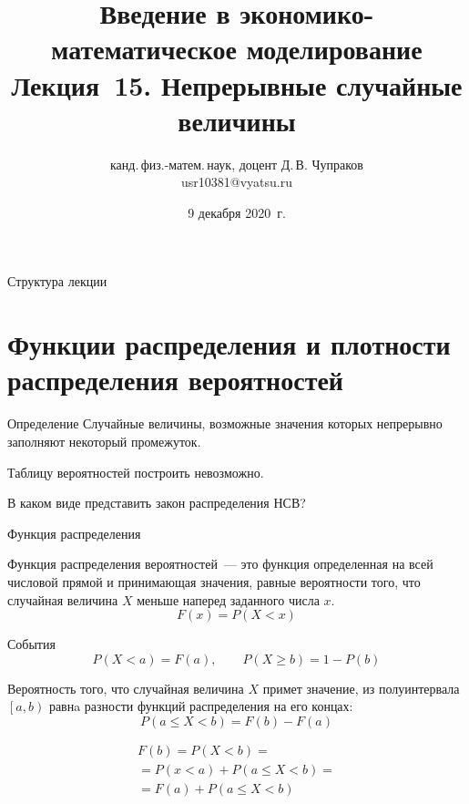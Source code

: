 \documentclass[unicode,11pt,notheorems,xcolor=table]{beamer}
\author[Д.\,В. Чупраков]{канд.\,физ.-матем.\,наук, доцент Д.\,В. Чупраков\\[6pt] usr10381@vyatsu.ru}
\institute[ВятГУ]{ФГБОУ ВО Вятский государственный университет}
\title[Лекция~15. Непрерывные случайные величины]{
	Введение в экономико-математическое моделирование\\[12pt]
	Лекция~15. Непрерывные случайные величины}
\date{9 декабря 2020~г.}
\begin{document}
\maketitle

\begin{frame}{Структура лекции}{}
	\tableofcontents
\end{frame}

\section{Функции распределения и плотности распределения вероятностей}
\begin{frame}{}{}
    \begin{block}{Определение}
        Случайные величины, возможные значения которых непрерывно заполняют некоторый промежуток.
    \end{block}


    \bigskip
    Таблицу вероятностей построить невозможно.
    
    \bigskip
    В каком виде представить закон распределения НСВ?  
    
    
    
\end{frame}

\begin{frame}{Функция распределения}{}
    \begin{block}{}
        Функция распределения вероятностей~--- это функция определенная на всей числовой прямой и принимающая значения, равные вероятности того, что случайная величина $X$ меньше наперед заданного числа $x$.
        $$
            F(x)=P(X<x)
        $$
        \end{block}
\end{frame}


\begin{frame}{События}{}
    $$
        P(X<a)=F(a), \qquad P(X \geqslant b) = 1-P(b)
    $$
    \begin{block}{}
        Вероятность того, что случайная величина $X$ примет значение, из полуинтервала $\left[ a,b\right)$ равнa разности функций распределения на его концах:
        $$
            P(a \leqslant X <b) = F(b)-F(a)
        $$
    \end{block}

    \vspace{-5mm}
    \begin{multline*}
        F(b) = P(X<b) 
        =\\
        = P(x<a)+ P(a \leqslant X <b) 
        =\\
        = F(a) + P(a \leqslant X <b)
    \end{multline*}

\end{frame}
\end{document}
